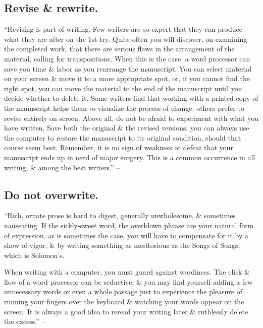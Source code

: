 \documentclass{article}
\numberwithin{equation}{section}
\begin{document}

\subsection{Revise \& rewrite.}
``Revising is part of writing. Few writers are so expert that they can produce what they are after on the 1st try. Quite often you will discover, on examining the completed work, that there are serious flaws in the arrangement of the material, calling for transpositions. When this is the case, a word processor can save you time \& labor as you rearrange the manuscript. You can select material on your screen \& move it to a more appropriate spot, or, if you cannot find the right spot, you can move the material to the end of the manuscript until you decide whether to delete it. Some writers find that working with a printed copy of the manuscript helps them to visualize the process of change; others prefer to revise entirely on screen. Above all, do not be afraid to experiment with what you have written. Save both the original \& the revised versions; you can always use the computer to restore the manuscript to its original condition, should that course seem best. Remember, it is no sign of weakness or defeat that your manuscript ends up in need of major surgery. This is a common occurrence in all writing, \& among the best writers.'' -- \cite[p. 82]{Strunk_White2019}


\subsection{Do not overwrite.}
``Rich, ornate prose is hard to digest, generally unwholesome, \& sometimes nauseating. If the sickly-sweet word, the overblown phrase are your natural form of expression, as is sometimes the case, you will have to compensate for it by a show of vigor, \& by writing something as meritorious as the Songs of Songs, which is Solomon's.

When writing with a computer, you must guard against wordiness. The click \& flow of a word processor can be seductive, \& you may find yourself adding a few unnecessary words or even a whole passage just to experience the pleasure of running your fingers over the keyboard \& watching your words appear on the screen. It is always a good idea to reread your writing later \& ruthlessly delete the excess.'' -- \cite[p. 83]{Strunk_White2019}
\end{document}
